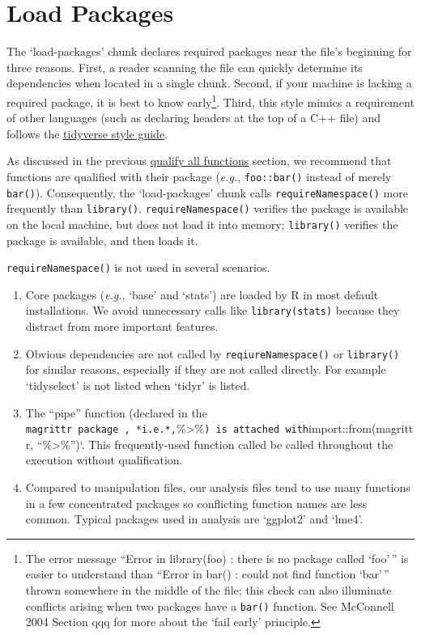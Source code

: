 \documentclass[
]{book}
\providecommand{\tightlist}{%
  \setlength{\itemsep}{0pt}\setlength{\parskip}{0pt}}
\begin{document}
\hypertarget{chunk-load-packages}{%
\section{Load Packages}\label{chunk-load-packages}}

The `load-packages' chunk declares required packages near the file's beginning for three reasons. First, a reader scanning the file can quickly determine its dependencies when located in a single chunk. Second, if your machine is lacking a required package, it is best to know early\footnote{The error message ``Error in library(foo) : there is no package called `foo'\,'' is easier to understand than ``Error in bar() : could not find function `bar'\,'' thrown somewhere in the middle of the file; this check can also illuminate conflicts arising when two packages have a \texttt{bar()} function. See McConnell 2004 Section qqq for more about the `fail early' principle.}. Third, this style mimics a requirement of other languages (such as declaring headers at the top of a C++ file) and follows the \href{https://style.tidyverse.org/files.html\#internal-structure}{tidyverse style guide}.

As discussed in the previous \protect\hyperlink{qualify-functions}{qualify all functions} section, we recommend that functions are qualified with their package (\emph{e.g.}, \texttt{foo::bar()} instead of merely \texttt{bar()}). Consequently, the `load-packages' chunk calls \texttt{requireNamespace()} more frequently than \texttt{library()}. \texttt{requireNamespace()} verifies the package is available on the local machine, but does not load it into memory; \texttt{library()} verifies the package is available, and then loads it.

\texttt{requireNamespace()} is not used in several scenarios.

\begin{enumerate}
\def\labelenumi{\arabic{enumi}.}
\tightlist
\item
  Core packages (\emph{e.g.}, `base' and `stats') are loaded by R in most default installations. We avoid unnecessary calls like \texttt{library(stats)} because they distract from more important features.
\item
  Obvious dependencies are not called by \texttt{reqiureNamespace()} or \texttt{library()} for similar reasons, especially if they are not called directly. For example `tidyselect' is not listed when `tidyr' is listed.
\item
  The ``pipe'' function (declared in the \texttt{magrittr\textquotesingle{}\ package\ ,\ *i.e.*,}\%\textgreater\%\texttt{)\ is\ attached\ with}import::from(magrittr, ``\%\textgreater\%'')`. This frequently-used function called be called throughout the execution without qualification.
\item
  Compared to manipulation files, our analysis files tend to use many functions in a few concentrated packages so conflicting function names are less common. Typical packages used in analysis are `ggplot2' and `lme4'.
\end{enumerate}
\end{document}
